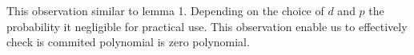 This observation similar to lemma 1. Depending on the choice of $d$ and $p$ the probability it negligible for practical use. This observation enable us to effectively check is commited polynomial is zero polynomial. 






